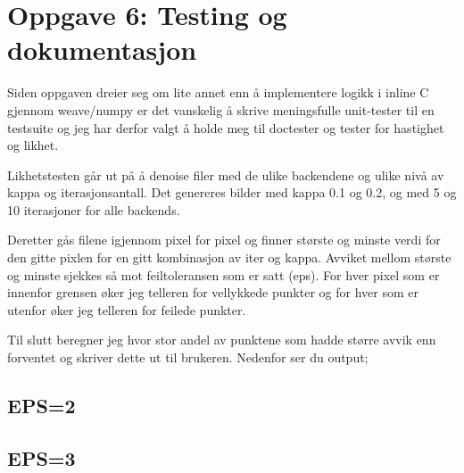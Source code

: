 \section*{Oppgave 6: Testing og dokumentasjon}
Siden oppgaven dreier seg om lite annet enn å implementere logikk i inline C gjennom weave/numpy er det vanskelig å skrive meningsfulle unit-tester til en testsuite og jeg har derfor valgt å holde meg til doctester og tester for hastighet og likhet.

Likhetstesten går ut på å denoise filer med de ulike backendene og ulike nivå av kappa og iterasjonsantall. Det genereres bilder med kappa 0.1 og 0.2, og med 5 og 10 iterasjoner for alle backends.

Deretter gås filene igjennom pixel for pixel og finner største og minste verdi for den gitte pixlen for en gitt kombinasjon av iter og kappa. Avviket mellom største og minste sjekkes så mot feiltoleransen som er satt (eps). For hver pixel som er innenfor grensen øker jeg telleren for vellykkede punkter og for hver som er utenfor øker jeg telleren for feilede punkter.

Til slutt beregner jeg hvor stor andel av punktene som hadde større avvik enn forventet og skriver dette ut til brukeren. Nedenfor ser du output;

\subsection*{EPS=2}

\subsection*{EPS=3}
